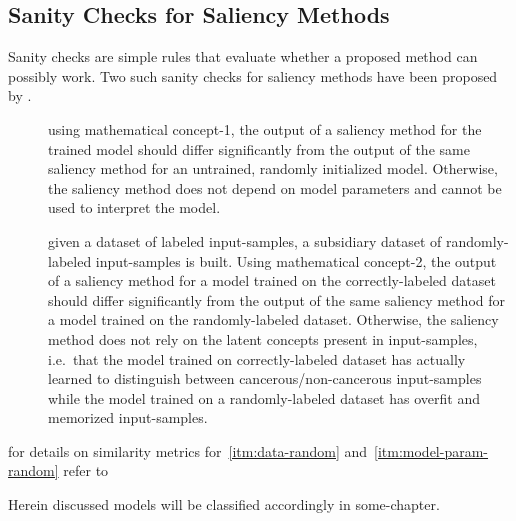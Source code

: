 \subsection{Sanity Checks for Saliency Methods}
Sanity checks are simple rules that evaluate whether a proposed method can possibly work. Two such sanity checks for saliency methods have been proposed by .

\begin{description}
    \item[]
     using mathematical concept-1, the output of a saliency method for the trained model should differ significantly from the output of the same saliency method for an untrained, randomly initialized model. Otherwise, the saliency method does not depend on model parameters and cannot be used to interpret the model.
    \item[] given a dataset of labeled input-samples, a subsidiary dataset of randomly-labeled input-samples is built. Using mathematical concept-2, the output of a saliency method for a model trained on the correctly-labeled dataset should differ significantly from the output of the same saliency method for a model trained on the randomly-labeled dataset. Otherwise, the saliency method does not rely on the latent concepts present in input-samples, i.e.\ that the model trained on correctly-labeled dataset has actually learned to distinguish between cancerous/non-cancerous input-samples while the model trained on a randomly-labeled dataset has overfit and memorized input-samples.
\end{description}
for details on similarity metrics for~\ref{itm:data-random} and~\ref{itm:model-param-random} refer to~\cite{Adebayo.2018}

Herein discussed models will be classified accordingly in some-chapter. 